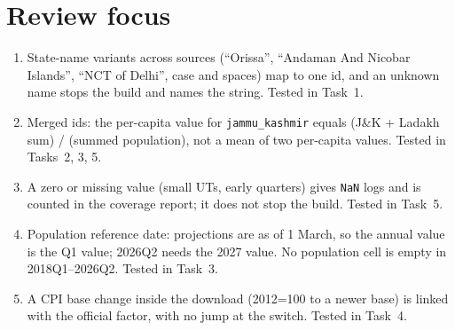 \documentclass[10pt,a4paper]{article}
\newcommand{\f}[1]{\texttt{#1}}
\begin{document}
\section*{Review focus}
\begin{enumerate}
\item State-name variants across sources (``Orissa'', ``Andaman And Nicobar Islands'', ``NCT of Delhi'', case and
      spaces) map to one id, and an unknown name stops the build and names the string. Tested in Task~1.
\item Merged ids: the per-capita value for \f{jammu\_kashmir} equals (J\&K + Ladakh sum) / (summed population), not
      a mean of two per-capita values. Tested in Tasks~2, 3, 5.
\item A zero or missing value (small UTs, early quarters) gives \f{NaN} logs and is counted in the coverage report;
      it does not stop the build. Tested in Task~5.
\item Population reference date: projections are as of 1 March, so the annual value is the Q1 value; 2026Q2
      needs the 2027 value. No population cell is empty in 2018Q1--2026Q2. Tested in Task~3.
\item A CPI base change inside the download (2012=100 to a newer base) is linked with the official factor, with
      no jump at the switch. Tested in Task~4.
\end{enumerate}
\end{document}

